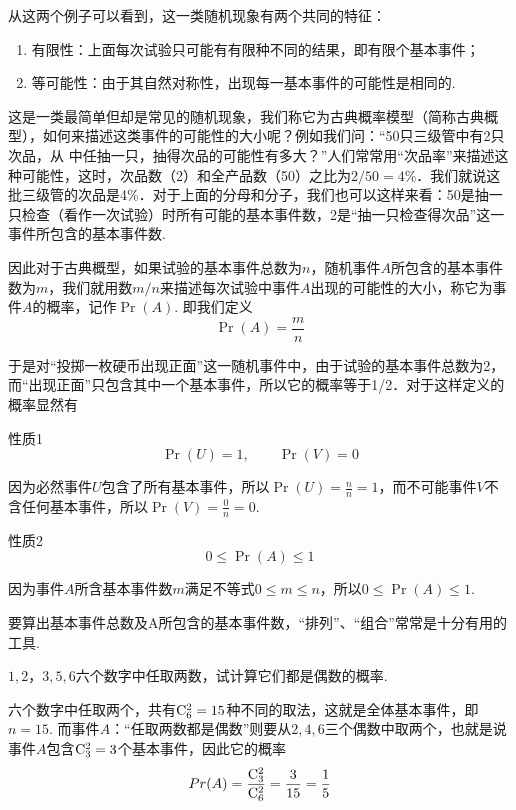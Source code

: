 从这两个例子可以看到，这一类随机现象有两个共同的特征：
\begin{enumerate}[(1)]
    \item 有限性：上面每次试验只可能有有限种不同的结果，即有限个基本事件；
    \item 等可能性：由于其自然对称性，出现每一基本事件的可能性是相同的.
\end{enumerate}

这是一类最简单但却是常见的随机现象，我们称它为古典概率模型（简称古典概型），如何来描述这类事件的可能性的大小呢？例如我们问：“50只三级管中有2只次品，从
中任抽一只，抽得次品的可能性有多大？”人们常常用“次品率”来描述这种可能性，这时，次品数（2）和全产品数（50）之比为$2/50=4\%$．我们就说这批三级管的次品是4\%．对于上面的分母和分子，我们也可以这样来看：50是抽一只检查（看作一次试验）时所有可能的基本事件数，2是“抽一只检查得次品”这一事件所包含的基本事件数.

因此对于古典概型，如果试验的基本事件总数为$n$，随机事件$A$所包含的基本事件数为$m$，我们就用数$m/n$来描述每次试验中事件$A$出现的可能性的大小，称它为事件$A$的概率，记作$\Pr(A)$. 即我们定义
\[\Pr(A)=\frac{m}{n}\]

于是对“投掷一枚硬币出现正面”这一随机事件中，由于试验的基本事件总数为2，而“出现正面”只包含其中一个基本事件，所以它的概率等于1/2．对于这样定义的概率显然有

\begin{blk}
    {性质1} \[\Pr(U)=1,\qquad \Pr(V)=0\]
\end{blk}

因为必然事件$U$包含了所有基本事件，所以$\Pr(U)=\frac{n}{n}=1$，而不可能事件$V$不含任何基本事件，所以$\Pr(V)=\frac{0}{n}=0$.

\begin{blk}
 { 性质2}\[0\le \Pr(A)\le 1\]  
\end{blk}

因为事件$A$所含基本事件数$m$满足不等式$0\le m\le n$，所以$0\le \Pr(A)\le 1$.

要算出基本事件总数及A所包含的基本事件数，“排列”、“组合”常常是十分有用的工具.

\begin{example}
    $1,2，3,5,6$六个数字中任取两数，试计算它们都是偶数的概率.
\end{example}

\begin{solution}
    六个数字中任取两个，共有${\rm C}^{2}_{6}=15$种不同的取法，这就是全体基本事件，即$n=15$. 而事件$A$：“任取两数都是偶数”则要从$2,4,6$三个偶数中取两个，也就是说事件$A$包含${\rm C}^{2}_{3}=3$个基本事件，因此它的概率
\[Pr(A)=\dfrac{{\rm C}^{2}_{3}}{{\rm C}^{2}_{6}}=\dfrac{3}{15}=\dfrac{1}{5}\]
\end{solution}


